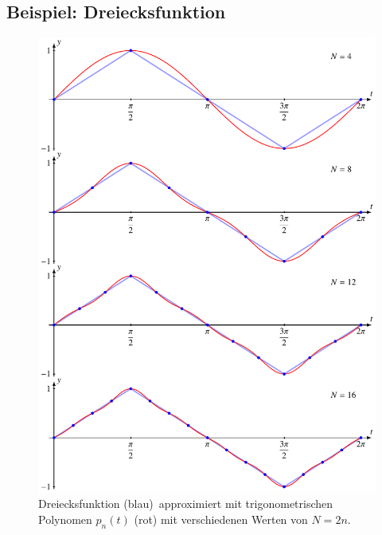 \subsection{Beispiel: Dreiecksfunktion}
\begin{figure}
\centering
\includegraphics{chapters/6/dreieck.pdf}
\caption{Dreiecksfunktion ({\color{blue}blau}) approximiert mit
trigonometrischen Polynomen  $p_n(t)$ ({\color{red}rot})
mit verschiedenen Werten von $N=2n$.
\label{skript:fourier:beispiel}}
\end{figure}
